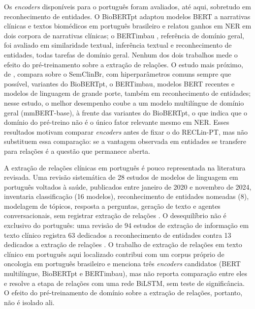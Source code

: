 Os \emph{encoders} disponíveis para o português foram avaliados, até aqui, sobretudo
em reconhecimento de entidades. O BioBERTpt \cite{schneider_2020_biobertpt}
adaptou modelos BERT a narrativas clínicas e textos biomédicos em português
brasileiro e relatou ganhos em NER em dois corpora de narrativas clínicas; o
BERTimbau \cite{souza_2020_bertimbau}, referência de domínio geral, foi avaliado em
similaridade textual, inferência textual e reconhecimento de entidades, todas tarefas
de domínio geral. Nenhum dos dois trabalhos mede o efeito do pré-treinamento sobre a
extração de relações. O estudo mais próximo, de ,
compara sobre o SemClinBr, com hiperparâmetros comuns sempre que possível, variantes
do BioBERTpt, o BERTimbau, modelos BERT recentes e modelos de linguagem de grande
porte, também em reconhecimento de entidades; nesse estudo, o melhor desempenho
coube a um modelo multilíngue de domínio geral (mmBERT-base), à frente das variantes
do BioBERTpt, o que indica que o domínio do pré-treino não é o único fator relevante
mesmo em NER. Esses resultados motivam comparar \emph{encoders} antes de fixar o do
RECLin-PT, mas não substituem essa comparação: se a vantagem observada em entidades se
transfere para relações é a questão que permanece aberta.

A extração de relações clínicas em português é pouco representada na literatura
revisada. Uma revisão sistemática de 28 estudos de modelos de linguagem em português
voltados à saúde, publicados entre janeiro de 2020 e novembro de 2024, inventaria
classificação (16 modelos), reconhecimento de entidades nomeadas (8), modelagem de
tópicos, resposta a perguntas, geração de texto e agentes conversacionais, sem
registrar extração de relações \cite{shimaoka_2026_revisao}. O desequilíbrio não é
exclusivo do português: uma revisão de 94 estudos de extração de informação em texto
clínico registra 63 dedicados a reconhecimento de entidades contra 13 dedicados a
extração de relações \cite{navarro_2023_revisao}. O trabalho de extração de relações
em texto clínico em português aqui localizado \cite{silva_2023_oncologia} contribui
com um corpus próprio de oncologia em português brasileiro e menciona três
\emph{encoders} candidatos (BERT multilíngue, BioBERTpt e BERTimbau), mas não
reporta comparação entre eles e resolve a etapa de relações com uma rede BiLSTM, sem
teste de significância. O efeito do pré-treinamento de domínio sobre a extração de
relações, portanto, não é isolado ali.

